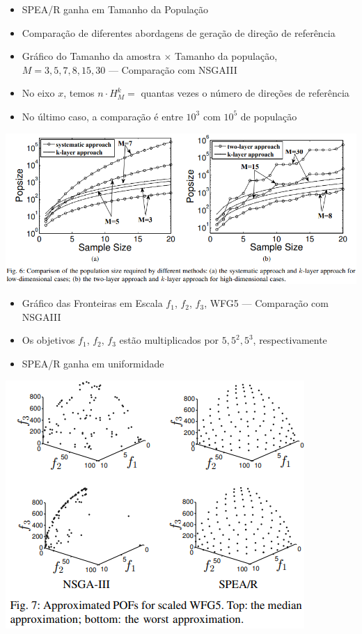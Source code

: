 \documentclass{rbfin}
\begin{document}
\newpage

\begin{itemize}
  \item SPEA/R ganha em Tamanho da População
  \item Comparação de diferentes abordagens de geração de direção de referência
  \item Gráfico do Tamanho da amostra $\times$ Tamanho da população, $M = 3, 5, 7, 8, 15, 30$ --- Comparação com NSGAIII
  \item No eixo $x$, temos $n \cdot H^k_M=$ quantas vezes o número de direções de referência
  \item No último caso, a comparação é entre $10^3$ com $10^5$ de população
\end{itemize}

\begin{center}
\includegraphics[scale=1]{fig6}
\end{center}

\newpage

\begin{itemize}
  \item Gráfico das Fronteiras em Escala $f_1$, $f_2$, $f_3$, WFG5 --- Comparação com NSGAIII
  \item Os objetivos $f_1$, $f_2$, $f_3$ estão multiplicados por $5, 5^2, 5^3$, respectivamente
  \item SPEA/R ganha em uniformidade
\end{itemize}

\begin{center}
\includegraphics[scale=1.2]{fig7}
\end{center}
\end{document}
